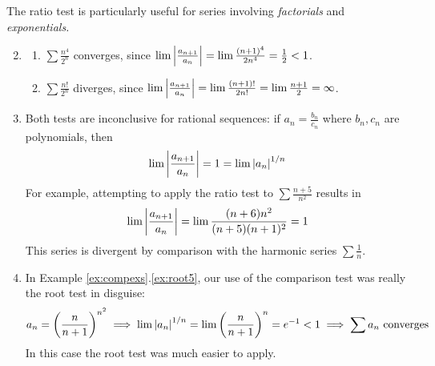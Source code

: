 \begin{examples}{}{}
\exstart The ratio test is particularly useful for series involving \emph{factorials} and \emph{exponentials.}
\begin{enumerate}\setcounter{enumi}{1}
	\item[]\begin{enumerate}
	  \item $\sum\frac{n^4}{2^n}$ converges, since $\lim\left| \frac{a_{n+1}}{a_n}\right|=\lim\frac{(n+1)^4}{2n^4}=\frac 12<1$.
		\item $\sum\frac{n!}{2^n}$ diverges, since $\lim\left| \frac{a_{n+1}}{a_n}\right| =\lim\frac{(n+1)!}{2n!}=\lim \frac{n+1}2=\infty$.
	\end{enumerate}
	
	\item Both tests are inconclusive for rational sequences: if $a_n=\frac{b_n}{c_n}$ where $b_n,c_n$ are polynomials, then
	\[
		\lim\left| \frac{a_{n+1}}{a_n}\right|=1=\lim\left| a_n\right|^{1/n}
	\]
	For example, attempting to apply the ratio test to $\sum\frac{n+5}{n^2}$ results in
	\[
		\lim\left| \frac{a_{n+1}}{a_n}\right| =\lim \frac{(n+6)n^2}{(n+5)(n+1)^2}=1
	\]
	This series is divergent by comparison with the harmonic series $\sum \frac 1n$.
	
	
	\item In Example \ref*{ex:compexs}.\ref{ex:root5}, our use of the comparison test was really the root test in disguise:
	\[
		a_n=\left(\frac n{n+1}\right)^{n^2}
		\implies \lim\left| a_n\right|^{1/n}
		=\lim\left(\frac n{n+1}\right)^{n}
		=e^{-1}<1 
		\implies \sum a_n\text{ converges}
	\]
	In this case the root test was much easier to apply.
	
	
	\goodbreak
	

\end{enumerate}
\end{examples}
